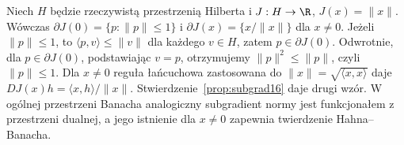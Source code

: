 \begin{przyklad}
\label{ex:norm-subgrad16}
Niech $H$ będzie rzeczywistą przestrzenią Hilberta
i $J:H\to\R$, $J(x)=\|x\|$. Wówczas
$\partial J(0)=\{p:\|p\|\le1\}$ i
$\partial J(x)=\{x/\|x\|\}$ dla $x\ne0$.
Jeżeli $\|p\|\le1$, to $\langle p,v\rangle\le\|v\|$
dla każdego $v\in H$, zatem $p\in\partial J(0)$.
Odwrotnie, dla $p\in\partial J(0)$, podstawiając $v=p$,
otrzymujemy $\|p\|^2\le\|p\|$, czyli $\|p\|\le1$.
Dla $x\ne0$ reguła łańcuchowa zastosowana do
$\|x\|=\sqrt{\langle x,x\rangle}$ daje
$DJ(x)h=\langle x,h\rangle/\|x\|$.
Stwierdzenie~\ref{prop:subgrad16} daje drugi wzór.
W ogólnej przestrzeni Banacha analogiczny subgradient normy
jest funkcjonałem z przestrzeni dualnej, a jego istnienie
dla $x\ne0$ zapewnia twierdzenie Hahna--Banacha.
\end{przyklad}

